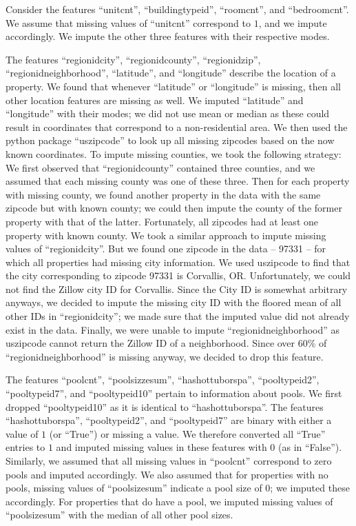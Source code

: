 \documentclass[12pt]{article}
\begin{document}
Consider the features ``unitcnt'', ``buildingtypeid'', ``roomcnt'', and ``bedroomcnt''. We assume that missing values of ``unitcnt'' correspond to $1$, and we impute accordingly. We impute the other three features with their respective modes.

The features ``regionidcity'', ``regionidcounty'', ``regionidzip'', ``regionidneighborhood'', ``latitude'', and ``longitude'' describe the location of a property. We found that whenever ``latitude'' or ``longitude'' is missing, then all other location features are missing as well. We imputed ``latitude'' and ``longitude'' with their modes; we did not use mean or median as these could result in coordinates that correspond to a non-residential area. We then used the python package ``uszipcode'' to look up all missing zipcodes based on the now known coordinates. To impute missing counties, we took the following strategy: We first observed that ``regionidcounty'' contained three counties, and we assumed that each missing county was one of these three. Then for each property with missing county, we found another property in the data with the same zipcode but with known county; we could then impute the county of the former property with that of the latter. Fortunately, all zipcodes had at least one property with known county. We took a similar approach to impute missing values of ``regionidcity''. But we found one zipcode in the data -- 97331 -- for which all properties had missing city information. We used uszipcode to find that the city corresponding to zipcode 97331 is Corvallis, OR. Unfortunately, we could not find the Zillow city ID for Corvallis. Since the City ID is somewhat arbitrary anyways, we decided to impute the missing city ID with the floored mean of all other IDs in ``regionidcity''; we made sure that the imputed value did not already exist in the data. Finally, we were unable to impute ``regionidneighborhood'' as uszipcode cannot return the Zillow ID of a neighborhood. Since over 60\% of ``regionidneighborhood'' is missing anyway, we decided to drop this feature.

The features ``poolcnt'', ``poolsizzesum'', ``hashottuborspa'', ``pooltypeid2'', ``pooltypeid7'', and ``pooltypeid10'' pertain to information about pools. We first dropped ``pooltypeid10'' as it is identical to ``hashottuborspa''. The features ``hashottuborspa'', ``pooltypeid2'', and ``pooltypeid7'' are binary with either a value of $1$ (or ``True'') or missing a value. We therefore converted all ``True'' entries to $1$ and imputed missing values in these features with $0$ (as in ``False''). Similarly, we assumed that all missing values in ``poolcnt'' correspond to zero pools and imputed accordingly. We also assumed that for properties with no pools, missing values of ``poolsizesum'' indicate a pool size of $0$; we imputed these accordingly. For properties that do have a pool, we imputed missing values of ``poolsizesum'' with the median of all other pool sizes.
\end{document}
